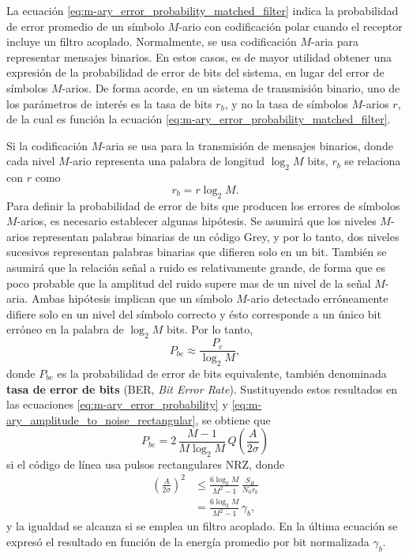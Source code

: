 \documentclass[a4paper]{article}
\begin{document}
La ecuación \ref{eq:m-ary_error_probability_matched_filter} indica la probabilidad de error promedio de un símbolo \(M\)-ario con codificación polar cuando el receptor incluye un filtro acoplado. 
Normalmente, se usa codificación \(M\)-aria para representar mensajes binarios. En estos casos, es de mayor utilidad obtener una expresión de la probabilidad de error de bits del sistema, en lugar del error de símbolos \(M\)-arios. De forma acorde, en un sistema de transmisión binario, uno de los parámetros de interés es la tasa de bits \(r_b\), y no la tasa de símbolos \(M\)-arios \(r\), de la cual es función la ecuación \ref{eq:m-ary_error_probability_matched_filter}. 

Si la codificación \(M\)-aria se usa para la transmisión de mensajes binarios, donde cada nivel \(M\)-ario representa una palabra de longitud \(\log_2M\) bits, \(r_b\) se relaciona con \(r\) como
\begin{equation}\label{eq:r_b_vs_r}
 r_b=r\log_2M.
\end{equation}
Para definir la probabilidad de error de bits que producen los errores de símbolos \(M\)-arios, es necesario establecer algunas hipótesis. Se asumirá que los niveles \(M\)-arios representan palabras binarias de un código Grey, y por lo tanto, dos niveles sucesivos representan palabras binarias que difieren solo en un bit. También se asumirá que la relación señal a ruido es relativamente grande, de forma que es poco probable que la amplitud del ruido supere mas de un nivel de la señal \(M\)-aria. Ambas hipótesis implican que un símbolo \(M\)-ario detectado erróneamente difiere solo en un nivel del símbolo correcto y ésto corresponde a un único bit erróneo en la palabra de \(\log_2M\) bits. Por lo tanto,
\[
 P_{be}\approx\frac{P_e}{\log_2M},
\]
donde \(P_{be}\) es la probabilidad de error de bits equivalente, también denominada \textbf{tasa de error de bits} (BER, \emph{Bit Error Rate}). Sustituyendo estos resultados en las ecuaciones \ref{eq:m-ary_error_probability} y \ref{eq:m-ary_amplitude_to_noise_rectangular}, se obtiene que
\begin{equation}\label{eq:m-ary_bit_error_error_probability}
 P_{be}=2\,\frac{M-1}{M\log_2M}\,Q\left(\frac{A}{2\sigma}\right)
\end{equation}
si el código de línea usa pulsos rectangulares NRZ, donde 
\begin{align}\label{eq:m-ary_amplitude_to_noise_aux}
 \left(\frac{A}{2\sigma}\right)^2&\leq\frac{6\log_2M}{M^2-1}\,\frac{S_R}{N_0r_b}\nonumber\\ 
   &=\frac{6\log_2M}{M^2-1}\,\gamma_b,
\end{align}
y la igualdad se alcanza si se emplea un filtro acoplado. En la última ecuación se expresó el resultado en función de la energía promedio por bit normalizada \(\gamma_b\).
\end{document}
